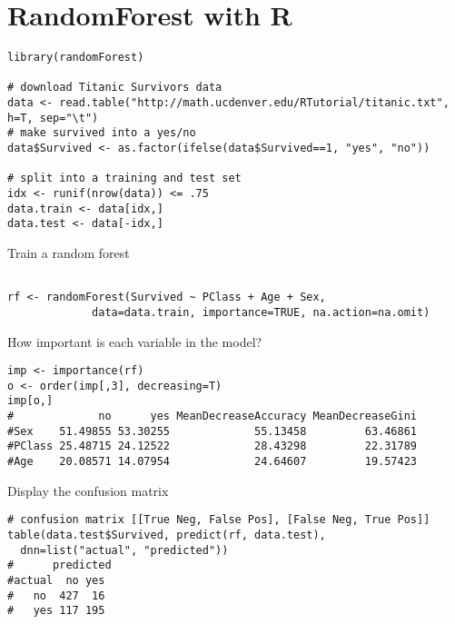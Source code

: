 \documentclass[caret-main.tex]{subfiles}
\begin{document}
\section{RandomForest with R}
\begin{framed}
\begin{verbatim}
library(randomForest)
 
# download Titanic Survivors data
data <- read.table("http://math.ucdenver.edu/RTutorial/titanic.txt", h=T, sep="\t")
# make survived into a yes/no
data$Survived <- as.factor(ifelse(data$Survived==1, "yes", "no"))                 
 
# split into a training and test set
idx <- runif(nrow(data)) <= .75
data.train <- data[idx,]
data.test <- data[-idx,]
\end{verbatim}
\end{framed} 
Train a random forest
\begin{framed}
\begin{verbatim} 

rf <- randomForest(Survived ~ PClass + Age + Sex, 
             data=data.train, importance=TRUE, na.action=na.omit)
\end{verbatim}
\end{framed} 
How important is each variable in the model?
\begin{framed}
\begin{verbatim}
imp <- importance(rf)
o <- order(imp[,3], decreasing=T)
imp[o,]
#             no      yes MeanDecreaseAccuracy MeanDecreaseGini
#Sex    51.49855 53.30255             55.13458         63.46861
#PClass 25.48715 24.12522             28.43298         22.31789
#Age    20.08571 14.07954             24.64607         19.57423
\end{verbatim}
\end{framed} 
Display the confusion matrix
\begin{framed}
\begin{verbatim} 
# confusion matrix [[True Neg, False Pos], [False Neg, True Pos]]
table(data.test$Survived, predict(rf, data.test),
  dnn=list("actual", "predicted"))
#      predicted
#actual  no yes
#   no  427  16
#   yes 117 195
\end{verbatim}
\end{framed}
\newpage
\end{document}
